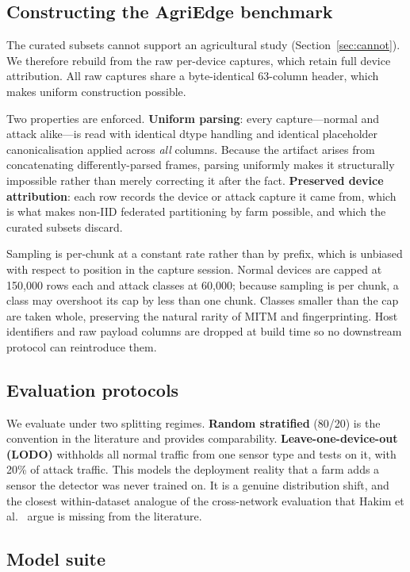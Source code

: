 \subsection{Constructing the AgriEdge benchmark}

The curated subsets cannot support an agricultural study
(Section~\ref{sec:cannot}). We therefore rebuild from the raw per-device
captures, which retain full device attribution. All raw captures share a
byte-identical 63-column header, which makes uniform construction possible.

Two properties are enforced. \textbf{Uniform parsing}: every capture---normal
and attack alike---is read with identical dtype handling and identical
placeholder canonicalisation applied across \emph{all} columns. Because the
artifact arises from concatenating differently-parsed frames, parsing uniformly
makes it structurally impossible rather than merely correcting it after the
fact. \textbf{Preserved device attribution}: each row records the device or
attack capture it came from, which is what makes non-IID federated partitioning
by farm possible, and which the curated subsets discard.

Sampling is per-chunk at a constant rate rather than by prefix, which is
unbiased with respect to position in the capture session. Normal devices are
capped at 150{,}000 rows each and attack classes at 60{,}000; because sampling
is per chunk, a class may overshoot its cap by less than one chunk. Classes
smaller than the cap are taken whole, preserving the natural rarity of MITM and
fingerprinting. Host identifiers and raw payload columns are dropped at build
time so no downstream protocol can reintroduce them.

\subsection{Evaluation protocols}

We evaluate under two splitting regimes. \textbf{Random stratified} (80/20) is
the convention in the literature and provides comparability.
\textbf{Leave-one-device-out (LODO)} withholds all normal traffic from one
sensor type and tests on it, with 20\% of attack traffic. This models the
deployment reality that a farm adds a sensor the detector was never trained on.
It is a genuine distribution shift, and the closest within-dataset analogue of
the cross-network evaluation that Hakim et al.~\cite{hakim2026crossdomain}
argue is missing from the literature.

\subsection{Model suite}


